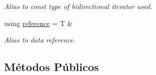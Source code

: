 \begin{DoxyCompactItemize}
\begin{DoxyCompactList}\small\item\em Alias to const type of bidirectional iterator used. \end{DoxyCompactList}\item 
\mbox{\label{classls_1_1list_afb0f652e0362bc8c3e82c16efe795bf3}} 
using \hyperlink{classls_1_1list_afb0f652e0362bc8c3e82c16efe795bf3}{reference} = T \&
\begin{DoxyCompactList}\small\item\em Alias to data reference. \end{DoxyCompactList}\end{DoxyCompactItemize}
\subsection*{Métodos Públicos}

